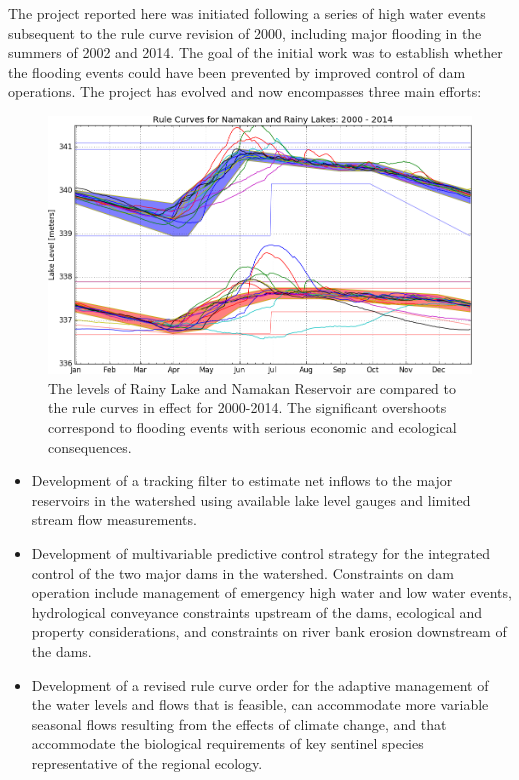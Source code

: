 \documentclass[preprint,times]{elsarticle}
\begin{document}
The project reported here was initiated following a series of high water events subsequent to the rule curve revision of 2000, including major flooding in the summers of 2002 and 2014. The goal of the initial work was to establish whether the flooding events could have been prevented by improved control of dam operations.  The project has evolved and now encompasses three main efforts:

\begin{figure}
\includegraphics[width=\linewidth]{RuleCurvePerformance2000-2014}
\caption{The levels of Rainy Lake and Namakan Reservoir are compared to the rule curves in effect for 2000-2014. The significant overshoots correspond to flooding events with serious economic and ecological consequences.}\label{figure:4}
\end{figure}

\begin{itemize}
\item Development of a tracking filter to estimate net inflows to the major reservoirs in the watershed using available lake level gauges and limited stream flow measurements.
\item Development of multivariable predictive control strategy for the integrated control of the two major dams in the watershed.  Constraints on dam operation include management of emergency high water and low water events, hydrological conveyance constraints upstream of the dams, ecological and property considerations, and constraints on river bank erosion downstream of the dams.
\item Development of a revised rule curve order for the adaptive management of the water levels and flows that is feasible, can accommodate more variable seasonal flows resulting from the effects of climate change, and that accommodate the biological requirements of key sentinel species representative of the regional ecology.	
\end{itemize}
\end{document}
